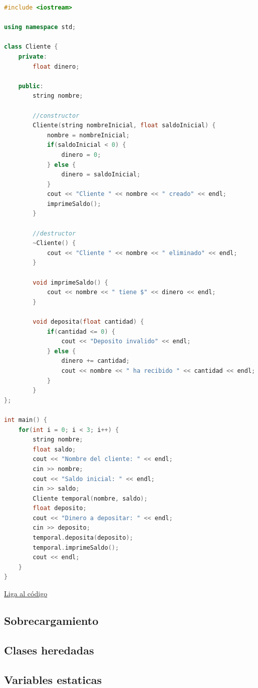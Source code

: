 \documentclass{article}
\begin{document}
\begin{lstlisting}[language=C++, caption=Destructores]
#include <iostream>

using namespace std;

class Cliente {
    private:
        float dinero;

    public:
        string nombre;

        //constructor
        Cliente(string nombreInicial, float saldoInicial) {
            nombre = nombreInicial;
            if(saldoInicial < 0) {
                dinero = 0;
            } else {
                dinero = saldoInicial;
            }
            cout << "Cliente " << nombre << " creado" << endl;
            imprimeSaldo();
        }

        //destructor
        ~Cliente() {
            cout << "Cliente " << nombre << " eliminado" << endl;
        }

        void imprimeSaldo() {
            cout << nombre << " tiene $" << dinero << endl;
        }

        void deposita(float cantidad) {
            if(cantidad <= 0) {
                cout << "Deposito invalido" << endl;
            } else {
                dinero += cantidad;
                cout << nombre << " ha recibido " << cantidad << endl;
            }
        }
};

int main() {
    for(int i = 0; i < 3; i++) {
        string nombre;
        float saldo;
        cout << "Nombre del cliente: " << endl;
        cin >> nombre;
        cout << "Saldo inicial: " << endl;
        cin >> saldo;
        Cliente temporal(nombre, saldo);
        float deposito;
        cout << "Dinero a depositar: " << endl;
        cin >> deposito;
        temporal.deposita(deposito);
        temporal.imprimeSaldo();
        cout << endl;
    }
}
\end{lstlisting}
\href{https://repl.it/@Jamesscn/Clases}{Liga al código} \\

\subsection{Sobrecargamiento}

\subsection{Clases heredadas}

\subsection{Variables estaticas}
\end{document}
